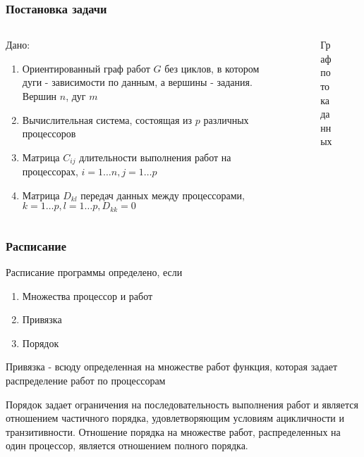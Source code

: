 \begin{frame}
    \frametitle{Постановка задачи}
    \begin{columns}
        \begin{column}{0.6\textwidth}
            Дано:
            \begin{enumerate}
                \item Ориентированный граф работ $G$ без циклов, в котором дуги - зависимости по данным, а вершины - задания. Вершин $n$, дуг $m$
                \item Вычислительная система, состоящая из $p$ различных процессоров
                \item Матрица $C_{ij}$ длительности выполнения работ на процессорах, $i=1 \dots n, j=1 \dots p$
                \item Матрица $D_{kl}$ передач данных между процессорами, $k=1 \dots p, l = 1 \dots p, D_{kk} = 0$
            \end{enumerate}
        \end{column}
        \begin{column}{0.4\textwidth}
            \begin{figure}
                \captionsetup{labelformat=empty}
                \caption{Граф потока данных}
            \end{figure}
        \end{column}
    \end{columns}
\end{frame}

\begin{frame}
    \frametitle{Расписание}
    Расписание программы определено, если
    \begin{enumerate}
        \item Множества процессор и работ
        \item Привязка
        \item Порядок
    \end{enumerate}
    \par
    Привязка - всюду определенная на множестве работ функция, которая задает распределение работ по процессорам
    \par
    Порядок задает ограничения на последовательность выполнения работ и является отношением частичного порядка, удовлетворяющим условиям ацикличности и транзитивности. Отношение порядка на множестве работ, распределенных на \\один процессор, является отношением полного порядка.
\end{frame}

